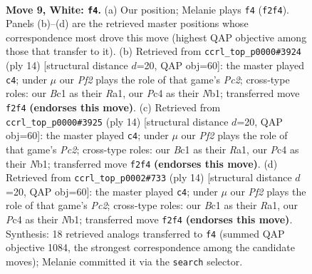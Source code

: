 \documentclass[11pt]{article}
\begin{document}
\clearpage

\begin{figure}[p]\centering
\begin{subfigure}{0.46\textwidth}\centering
\resizebox{\linewidth}{!}{%
\newchessgame
\chessboard[
  setfen={r1b1kbnr/p1ppqpp1/2p5/4P2p/2P5/8/PP2QPPP/RNB1KB1R w KQkq - 0 9},
  showmover=false,
  pgfstyle=straightmove, color=movearrow, markmove={f2-f4}
]}
\caption{}
\end{subfigure}\hfill
\begin{subfigure}{0.46\textwidth}\centering
\resizebox{\linewidth}{!}{%
\newchessgame
\chessboard[
  setfen={r1b1kb1r/p1ppqppp/2p5/3nP3/8/8/PPP1QPPP/RNB1KB1R w KQkq - 3 8},
  showmover=false,
  pgfstyle=straightmove, color=movearrow, markmove={c2-c4}
]}
\caption{}
\end{subfigure}
\\[4pt]
\begin{subfigure}{0.46\textwidth}\centering
\resizebox{\linewidth}{!}{%
\newchessgame
\chessboard[
  setfen={r1b1kb1r/p1ppqppp/2p5/3nP3/8/8/PPP1QPPP/RNB1KB1R w KQkq - 3 8},
  showmover=false,
  pgfstyle=straightmove, color=movearrow, markmove={c2-c4}
]}
\caption{}
\end{subfigure}\hfill
\begin{subfigure}{0.46\textwidth}\centering
\resizebox{\linewidth}{!}{%
\newchessgame
\chessboard[
  setfen={r1b1kb1r/p1ppqppp/2p5/3nP3/8/8/PPP1QPPP/RNB1KB1R w KQkq - 3 8},
  showmover=false,
  pgfstyle=straightmove, color=movearrow, markmove={c2-c4}
]}
\caption{}
\end{subfigure}
\caption{\textbf{Move 9, White: \texttt{f4}.} (a) Our position; Melanie plays \texttt{f4} (\texttt{f2f4}). Panels (b)--(d) are the retrieved master positions whose correspondence most drove this move (highest QAP objective among those that transfer to it). (b) Retrieved from \texttt{ccrl\_top\_p0000\#3924} (ply 14) [structural distance $d$=20, QAP obj=60]: the master played \texttt{c4}; under $\mu$ our \emph{Pf2} plays the role of that game's \emph{Pc2}; cross-type roles: our \emph{B}c1 as their \emph{R}a1, our \emph{P}c4 as their \emph{N}b1; transferred move \texttt{f2f4} \textbf{(endorses this move)}. (c) Retrieved from \texttt{ccrl\_top\_p0000\#3925} (ply 14) [structural distance $d$=20, QAP obj=60]: the master played \texttt{c4}; under $\mu$ our \emph{Pf2} plays the role of that game's \emph{Pc2}; cross-type roles: our \emph{B}c1 as their \emph{R}a1, our \emph{P}c4 as their \emph{N}b1; transferred move \texttt{f2f4} \textbf{(endorses this move)}. (d) Retrieved from \texttt{ccrl\_top\_p0002\#733} (ply 14) [structural distance $d$=20, QAP obj=60]: the master played \texttt{c4}; under $\mu$ our \emph{Pf2} plays the role of that game's \emph{Pc2}; cross-type roles: our \emph{B}c1 as their \emph{R}a1, our \emph{P}c4 as their \emph{N}b1; transferred move \texttt{f2f4} \textbf{(endorses this move)}. Synthesis: 18 retrieved analogs transferred to \texttt{f4} (summed QAP objective 1084, the strongest correspondence among the candidate moves); Melanie committed it via the \texttt{search} selector.}
\label{fig:thought-m16}
\end{figure}
\end{document}

